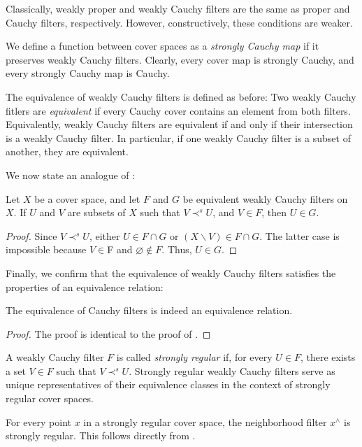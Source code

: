 \documentclass[reqno]{amsart}
\theoremstyle{definition}
\theoremstyle{remark}
\numberwithin{figure}{section}
\newcommand{\rb}{\prec}
\begin{document}
\begin{remark}
Classically, weakly proper and weakly Cauchy filters are the same as proper and Cauchy filters, respectively. However, constructively, these conditions are weaker.
\end{remark}

We define a function between cover spaces as a \emph{strongly Cauchy map} if it preserves weakly Cauchy filters.
Clearly, every cover map is strongly Cauchy, and every strongly Cauchy map is Cauchy.

The equivalence of weakly Cauchy filters is defined as before:
Two weakly Cauchy fitlers are \emph{equivalent} if every Cauchy cover contains an element from both filters.
Equivalently, weakly Cauchy filters are equivalent if and only if their intersection is a weakly Cauchy filter.
In particular, if one weakly Cauchy filter is a subset of another, they are equivalent.

We now state an analogue of :

\begin{lem}
Let $X$ be a cover space, and let $F$ and $G$ be equivalent weakly Cauchy filters on $X$.
If $U$ and $V$ are subsets of $X$ such that $V \rb^s U$, and $V \in F$, then $U \in G$.
\end{lem}
\begin{proof}
Since $V \rb^s U$, either $U \in F \cap G$ or $(X \backslash V) \in F \cap G$.
The latter case is impossible because $V \in $F and $\varnothing \notin F$.
Thus, $U \in G$.
\end{proof}

Finally, we confirm that the equivalence of weakly Cauchy filters satisfies the properties of an equivalence relation:

\begin{prop}
The equivalence of Cauchy filters is indeed an equivalence relation.
\end{prop}
\begin{proof}
The proof is identical to the proof of .
\end{proof}

A weakly Cauchy filter $F$ is called \emph{strongly regular} if, for every $U \in F$, there exists a set $V \in F$ such that $V \rb^s U$.
Strongly regular weakly Cauchy filters serve as unique representatives of their equivalence classes in the context of strongly regular cover spaces.

\begin{example}
For every point $x$ in a strongly regular cover space, the neighborhood filter $x^\wedge$ is strongly regular.
This follows directly from .
\end{example}
\end{document}
